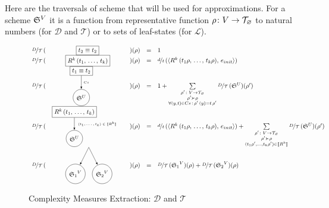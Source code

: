 Here are the traversals of scheme that will be used for approximations. For a scheme ${\mathfrak{S}}^{V}$ it is a function from representative function $\rho \colon V \to \mathcal{T}_{\varnothing}$ to natural numbers (for $\mathcal{D}$ and $\mathcal{T}$) or to sets of leaf-states (for $\mathcal{L}$).

\begin{figure}[t]
\[
\begin{array}{rclcl}
 \mathcal{\nicefrac{D}{T}}\,(&\parbox[m]{1.3cm}{\schemenode{$\unigoal{t_2}{t_2}$}}&)(\rho) &=& 1  \\

 \mathcal{\nicefrac{D}{T}}\,(&\parbox[m]{2.5cm}{\schemenode{$\invokegoal{R^k}{t_1}{t_k}$}}&)(\rho) &=& \nicefrac{d}{t}\,(\taskst{\invokegoal{R^k}{t_1 \rho}{t_k \rho}}{e_{init}}) \\

 \mathcal{\nicefrac{D}{T}}\,(&\parbox[m]{2cm}{\schemesarrow{$\unigoal{t_1}{t_2}$}{$Cs$}{$\schemewithvset{\mathfrak{S}}{U}$}} &)(\rho) &=& 1 +
      \sum\limits_{\substack{ \rho' \colon V \to \grterms \\
                                      \rho' \succ \rho \\
                                      \forall (y, t) \in Cs\,:\, \rho'\,(y) = t\, \rho'  }}
           \mathcal{\nicefrac{D}{T}}\,(\schemewithvset{\mathfrak{S}}{U})(\rho')  \\

 \mathcal{\nicefrac{D}{T}}\,(& \parbox[m]{4cm}{\schemedarrow{$\invokegoal{R^k}{t_1}{t_k}$}{ $(t_1, \dots, t_k) \in \sembr{R^k}  $}{$\schemewithvset{\mathfrak{S}}{U}$}} &)(\rho) &=&
      \nicefrac{d}{t}\,(\taskst{\invokegoal{R^k}{t_1 \rho}{t_k \rho}}{e_{init}}) +
      \sum\limits_{\substack{ \rho' \colon V \to \grterms \\
                                      \rho' \succ \rho \\
                                      (t_1 \rho', \dots, t_k \rho') \in \sembr{R^k}  }}
           \mathcal{\nicefrac{D}{T}}\,(\schemewithvset{\mathfrak{S}}{U})(\rho')  \\

 \mathcal{\nicefrac{D}{T}}\,(&\parbox[m]{2.5cm}{\schemefork{$\schemewithvset{\mathfrak{S}_1}{V}$}{$\schemewithvset{\mathfrak{S}_2}{V}$}}&)(\rho) &=&
 \mathcal{\nicefrac{D}{T}}\,(\schemewithvset{\mathfrak{S}_1}{V})(\rho) + \mathcal{\nicefrac{D}{T}}\,(\schemewithvset{\mathfrak{S}_2}{V})(\rho)
\end{array}
\]
\caption{Complexity Measures Extraction: $\mathcal D$ and $\mathcal T$}
\label{fig:scheduling_extraction_d_t}
\end{figure}


